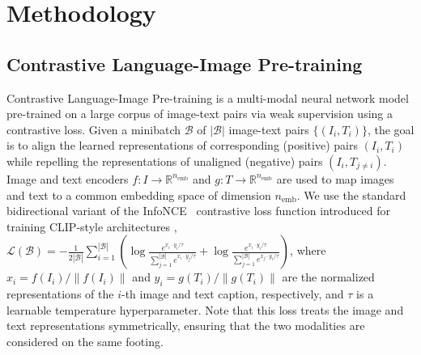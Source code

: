 \documentclass{article} %
\newcommand{\hubble}{\emph{Hubble}\xspace}
\begin{document}
   \section{Methodology}
   \label{sec:methodology}
   
   
   \subsection{Contrastive Language-Image Pre-training}
   
   Contrastive Language-Image Pre-training \citep[CLIP;][]{radford2021learning} is a multi-modal neural network model pre-trained on a large corpus of image-text pairs via weak supervision using a contrastive loss.
   Given a minibatch $\mathcal{B}$ of $|\mathcal{B}|$ image-text pairs $\{(I_i, T_i)\}$, the goal is to align the learned representations of corresponding (positive) pairs $(I_i, T_i)$ while repelling the representations of unaligned (negative) pairs $(I_i, T_{j\neq i})$.
   Image and text encoders $f: I \rightarrow \mathbb R^{n_\text{emb}}$ and $g: T \rightarrow \mathbb R^{n_\text{emb}}$ are used to map images and text to a common embedding space of dimension $n_\text{emb}$.
   We use the standard bidirectional variant of the InfoNCE~\citep{oord2018representation} contrastive loss function introduced for training CLIP-style architectures \citep{radford2021learning},
   $\mathcal{L}(\mathcal{B})=-\frac{1}{2|\mathcal{B}|} \sum_{i=1}^{|\mathcal{B}|}\left(\log \frac{e^{x_i \cdot y_i / \tau}}{\sum_{j=1}^{|\mathcal{B}|} e^{x_i \cdot y_j / \tau}}+\log \frac{e^{x_i \cdot y_i / \tau}}{\sum_{j=1}^{|\mathcal{B}|} e^{x_j \cdot y_i / \tau}}\right)$,
   where ${x}_i={f\left(I_i\right)}/{\left\|f\left(I_i\right)\right\|}$ and ${y}_i={g\left(T_i\right)}/{\left\|g\left(T_i\right)\right\|}$ are the normalized representations of the $i$-th image and text caption, respectively, and $\tau$ is a learnable temperature hyperparameter.
   Note that this loss treats the image and text representations symmetrically, ensuring that the two modalities are considered on the same footing.
   
\end{document}
